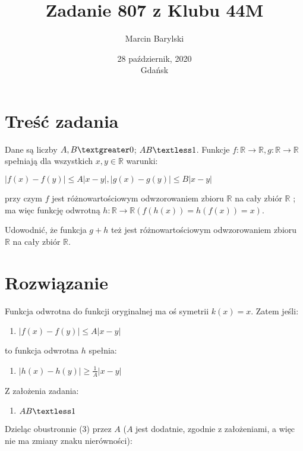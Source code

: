 \documentclass[10pt,onecolumn]{article}
\title{Zadanie 807 z Klubu 44M}
\author{Marcin Barylski}
\date{\small{28 październik, 2020 \\ Gdańsk}}
\begin{document}
\maketitle

\section{Treść zadania}

Dane są liczby $A, B \textgreater 0$; $AB \textless 1$. Funkcje $f : \mathbb{R} \rightarrow \mathbb{R},  g : \mathbb{R} \rightarrow \mathbb{R}$  spełniają dla wszystkich $x,y \in \mathbb{R}$  warunki: \par
$ \lvert f(x)-f(y) \rvert \leq A \lvert x-y \rvert, \lvert g(x)-g(y) \rvert \leq B \lvert x-y \rvert $ \par
przy czym  $f$ jest różnowartościowym odwzorowaniem zbioru $\mathbb{R}$  na cały zbiór $\mathbb{R}$ ; ma więc funkcję odwrotną $h : \mathbb{R} \rightarrow \mathbb{R} ( f(h(x)) = h( f (x)) = x)$. \par Udowodnić, że funkcja $g + h$  też jest różnowartościowym odwzorowaniem zbioru $\mathbb{R}$  na cały zbiór $\mathbb{R}$. 

\section{Rozwiązanie}

Funkcja odwrotna do funkcji oryginalnej ma oś symetrii $k(x) = x$. Zatem jeśli:

\begin{enumerate}[(1)]
\item $ \lvert f(x)-f(y) \rvert \leq A \lvert x-y \rvert$
\end{enumerate}

to funkcja odwrotna $h$ spełnia:

\begin{enumerate}[(2)]
\item $ \lvert h(x)-h(y) \rvert \geq \frac{1}{A} \lvert x-y \rvert$
\end{enumerate}

Z założenia zadania:

\begin{enumerate}[(3)]
\item $AB \textless 1$
\end{enumerate}

Dzieląc obustronnie (3) przez $A$ ($A$ jest dodatnie, zgodnie z założeniami, a więc nie ma zmiany znaku nierówności):
\end{document}
